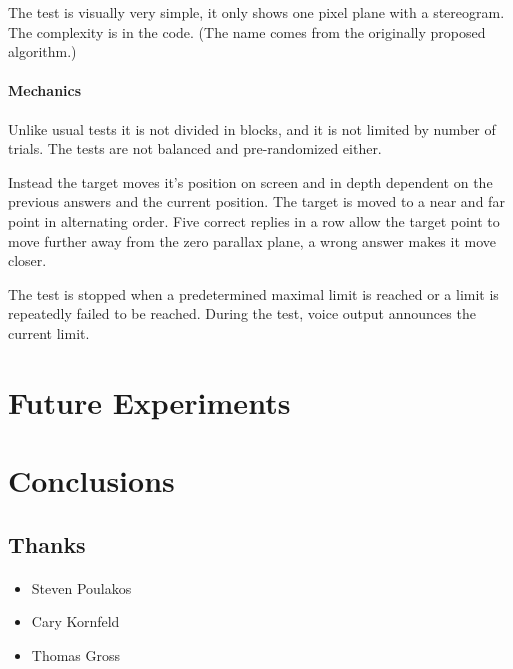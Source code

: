The test is visually very simple, it only shows one pixel plane with a stereogram.
The complexity is in the code.
(The name comes from the originally proposed algorithm.)

\paragraph{Mechanics}
Unlike usual tests it is not divided in blocks, and it is not limited by number of trials.
The tests are not balanced and pre-randomized either.

Instead the target moves it's position on screen and in depth dependent on the previous answers and the current position.
The target is moved to a near and far point in alternating order.
Five correct replies in a row allow the target point to move further away from the zero parallax plane,
a wrong answer makes it move closer.

The test is stopped when a predetermined maximal limit is reached or a limit is repeatedly failed to be reached.
During the test, voice output announces the current limit.


\section{Future Experiments}
\paragraph{}

\section{Conclusions}
\paragraph{}

\subsection{Thanks}
\paragraph{}
\begin{itemize}
\item Steven Poulakos
\item Cary Kornfeld
\item Thomas Gross
\end{itemize}

